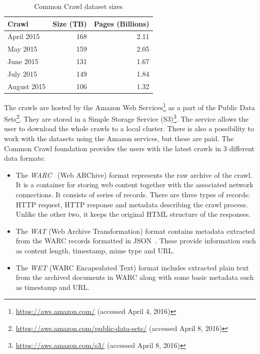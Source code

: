 \begin{table}[!htb]
	\centering
	\caption{Common Crawl dataset sizes}
	\label{table:common_crawl}
	\vspace{1em}
	\begin{tabular}{|l|r|r|}
		\hline
		\textbf{Crawl} & \textbf{Size (TB)} & \textbf{Pages (Billions)} \\
		\hline
		April 2015 & 168 & 2.11 \\
		May 2015 & 159 & 2.05 \\
		June 2015 & 131 & 1.67 \\
		July 2015 & 149 & 1.84 \\
		August 2015 & 106 & 1.32 \\
		\hline
	\end{tabular}
\end{table}

The crawls are hosted by the Amazon Web Services\footnote{\url{https://aws.amazon.com/} (accessed April 4, 2016)} as a part of the Public Data Sets\footnote{\url{https://aws.amazon.com/public-data-sets/} (accessed April 8, 2016)}. They are stored in a Simple Storage Service (S3)\footnote{\url{https://aws.amazon.com/s3/} (accessed April 8, 2016)}. The service allows the user to download the whole crawls to a local cluster. There is also a possibility to work with the datasets using the Amazon services, but these are paid. The Common Crawl foundation provides the users with the latest crawls in 3 different data formats:

\begin{itemize}
	\item The \textit{WARC}~\cite{WARC} (Web ARChive) format represents the raw archive of the crawl. It is a container for storing web content together with the associated network connections. It consists of series of records. There are three types of records: HTTP request, HTTP response and metadata describing the crawl process. Unlike the other two, it keeps the original HTML structure of the responses.
	
	\item The \textit{WAT} (Web Archive Transformation) format contains metadata extracted from the WARC records formatted in JSON~\cite{JSON}. These provide information such as content length, timestamp, mime type and URL.
	
	\item The \textit{WET} (WARC Encapsulated Text) format includes extracted plain text from the archived documents in WARC along with some basic metadata such as timestamp and URL.
\end{itemize}

